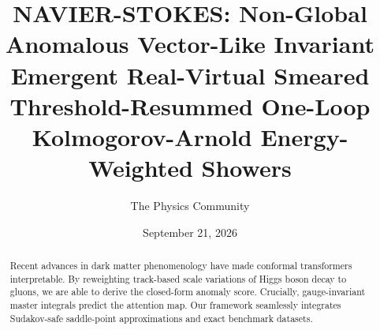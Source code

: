 \documentclass[11pt]{article}
\title{NAVIER-STOKES: Non-Global Anomalous Vector-Like Invariant Emergent Real-Virtual Smeared Threshold-Resummed One-Loop Kolmogorov-Arnold Energy-Weighted Showers}
\author{The Physics Community}
\date{September 21, 2026}
\begin{document}
\maketitle
\begin{abstract}
Recent advances in dark matter phenomenology have made conformal
transformers interpretable. By reweighting track-based scale variations
of Higgs boson decay to gluons, we are able to derive the closed-form
anomaly score. Crucially, gauge-invariant master integrals predict the
attention map. Our framework seamlessly integrates Sudakov-safe
saddle-point approximations and exact benchmark datasets.
\end{abstract}
\tableofcontents





\nocite{*}


\end{document}
